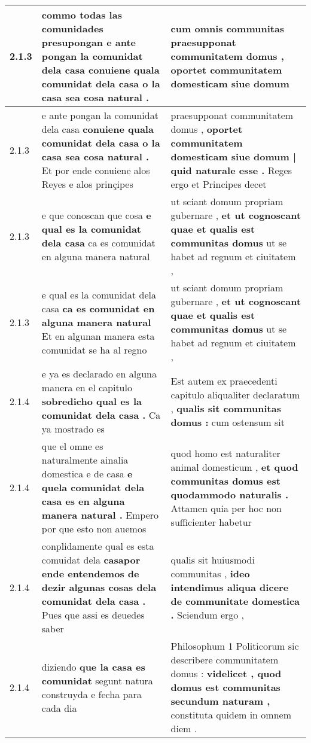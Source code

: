 \begin{tabular}{|p{1cm}|p{6.5cm}|p{6.5cm}|}
2.1.3 & commo todas las comunidades presupongan \textbf{ e ante pongan la comunidat dela casa } conuiene quala comunidat dela casa o la casa sea cosa natural . & cum omnis communitas \textbf{ praesupponat communitatem domus , } oportet communitatem domesticam siue domum \\\hline
2.1.3 & e ante pongan la comunidat dela casa \textbf{ conuiene quala comunidat dela casa o la casa sea cosa natural . } Et por ende conuiene alos Reyes e alos prinçipes & praesupponat communitatem domus , \textbf{ oportet communitatem domesticam siue domum | quid naturale esse . } Reges ergo et Principes decet \\\hline
2.1.3 & e que conoscan que cosa \textbf{ e qual es la comunidat dela casa } ca es comunidat en alguna manera natural & ut sciant domum propriam gubernare , \textbf{ et ut cognoscant quae et qualis est communitas domus } ut se habet ad regnum et ciuitatem , \\\hline
2.1.3 & e qual es la comunidat dela casa \textbf{ ca es comunidat en alguna manera natural } Et en algunan manera esta comunidat se ha al regno & ut sciant domum propriam gubernare , \textbf{ et ut cognoscant quae et qualis est communitas domus } ut se habet ad regnum et ciuitatem , \\\hline
2.1.4 & e ya es declarado en alguna manera en el capitulo \textbf{ sobredicho qual es la comunidat dela casa . } Ca ya mostrado es & Est autem ex praecedenti capitulo aliqualiter declaratum , \textbf{ qualis sit communitas domus : } cum ostensum sit \\\hline
2.1.4 & que el omne es naturalmente ainalia domestica e de casa \textbf{ e quela comunidat dela casa es en alguna manera natural . } Empero por que esto non auemos & quod homo est naturaliter animal domesticum , \textbf{ et quod communitas domus est quodammodo naturalis . } Attamen quia per hoc non sufficienter habetur \\\hline
2.1.4 & conplidamente qual es esta comuidat dela \textbf{ casapor ende entendemos de dezir algunas cosas dela comunidat dela casa . } Pues que assi es deuedes saber & qualis sit huiusmodi communitas , \textbf{ ideo intendimus aliqua dicere de communitate domestica . } Sciendum ergo , \\\hline
2.1.4 & diziendo \textbf{ que la casa es comunidat } segunt natura construyda e fecha para cada dia & Philosophum 1 Politicorum sic describere communitatem domus : \textbf{ videlicet , quod domus est communitas secundum naturam , } constituta quidem in omnem diem . \\\hline

\end{tabular}
